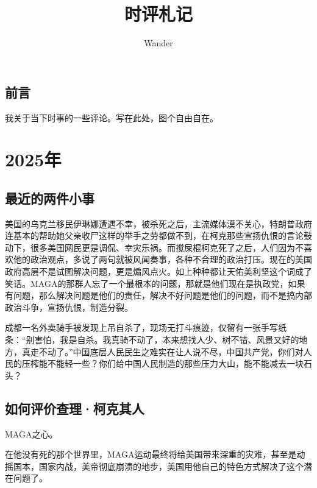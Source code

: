 \documentclass[12pt,oneside]{book}
\title{时评札记}
\author{Wander}
\begin{document}
\makemytitle



\frontmatter 
{}
\chapter*{前言}
我关于当下时事的一些评论。写在此处，图个自由自在。



\setcounter{tocdepth}{2}    
\tableofcontents


\mainmatter


\part{2025年}
\chapter{最近的两件小事}
美国的乌克兰移民伊琳娜遭遇不幸，被杀死之后，主流媒体漠不关心，特朗普政府连基本的帮助她父亲收尸这样的举手之劳都做不到，在柯克那些宣扬仇恨的言论鼓动下，很多美国网民更是调侃、幸灾乐祸。而搅屎棍柯克死了之后，人们因为不喜欢他的政治观点，多说了两句就被风闻奏事，各种不合理的政治打压。现在的美国政府高层不是试图解决问题，更是煽风点火。如上种种都让天佑美利坚这个词成了笑话。MAGA的那群人忘了一个最根本的问题，那就是他们现在是执政党，如果有问题，那么解决问题是他们的责任，解决不好问题是他们的问题，而不是搞内部政治斗争，宣扬仇恨，制造分裂。

成都一名外卖骑手被发现上吊自杀了，现场无打斗痕迹，仅留有一张手写纸条：“别害怕，我是自杀。我真骑不动了，本来想找人少、树不错、风景又好的地方，真走不动了。”中国底层人民民生之难实在让人说不尽，中国共产党，你们对人民的压榨能不能轻一些？你们给中国人民制造的那些压力大山，能不能减去一块石头？


\chapter{如何评价查理·柯克其人}
MAGA之心。

在他没有死的那个世界里，MAGA运动最终将给美国带来深重的灾难，甚至是动摇国本，国家内战，美帝彻底崩溃的地步，美国用他自己的特色方式解决了这个潜在问题了。
\end{document}
